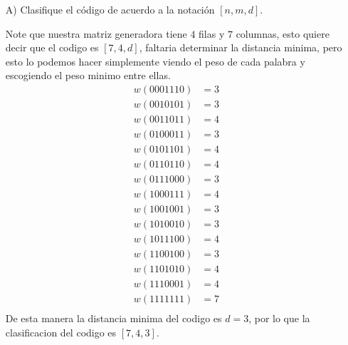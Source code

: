 \begin{itemize}
    \item[A)] Clasifique el código de acuerdo a la notación $[n,m,d]$.
    \begin{sols}
        Note que nuestra matriz generadora tiene $4$ filas y $7$ columnas, esto quiere decir que el codigo es $[7,4,d]$, faltaria determinar la distancia minima, pero esto lo podemos hacer simplemente viendo el peso de cada palabra y escogiendo el peso minimo entre ellas.
        \begin{align*}         
 w(0001110)&=3 \\
w(0010101)&=3 \\
 w(0011011)&=4 \\
w(0100011)&=3 \\
w(0101101)&=4 \\
 w(0110110)&=4 \\
w(0111000)&=3 \\
 w(1000111)&=4 \\
w(1001001)&=3 \\
w(1010010)&=3 \\
w(1011100)&=4 \\
w(1100100)&=3 \\
 w(1101010)&=4 \\
w(1110001)&=4 \\
 w(1111111)&=7 \\
        \end{align*}
        De esta manera la distancia minima del codigo es $d=3$, por lo que la clasificacion del codigo es $[7,4,3].$

    \end{sols}


\end{itemize}
